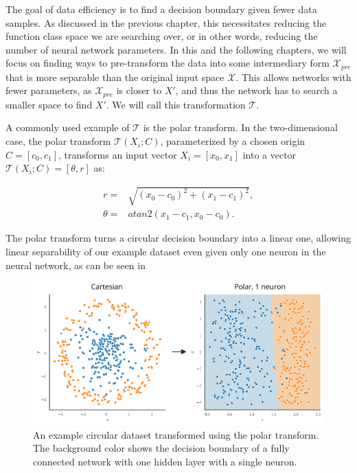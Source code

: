 The goal of data efficiency is to find a decision boundary given fewer data samples. As discussed in the previous chapter, this necessitates reducing the function class space we are searching over, or in other words, reducing the number of neural network parameters. In this and the following chapters, we will focus on finding ways to pre-transform the data into some intermediary form $\mathcal{X}_{pre}$ that is more separable than the original input space $\mathcal{X}$. This allows networks with fewer parameters, as $\mathcal{X}_{pre}$ is closer to $X'$, and thus the network has to search a smaller space to find $X'$. We will call this transformation $\mathcal{T}$.

A commonly used example of $\mathcal{T}$ is the polar transform. In the two-dimensional case, the polar transform $\mathcal{T}(X_i; C)$, parameterized by a chosen origin $C = [c_0, c_1]$, transforms an input vector $X_i = [x_0, x_1]$ into a vector $\mathcal{T}(X_i; C) = [\theta, r]$ as:

\begin{equation}
    \begin{aligned}
	r =& \sqrt{(x_0 - c_0)^2 + (x_1 - c_1)^2},\\
	\theta =& atan2(x_1 - c_1, x_0 - c_0).
    \end{aligned}
\end{equation}

The polar transform turns a circular decision boundary into a linear one, allowing linear separability of our example dataset even given only one neuron in the neural network, as can be seen in 

	\begin{figure}[h]
		\centering
		\includegraphics[width=0.65\linewidth]{images/4/polar_dataset_neurons}
		\caption{An example circular dataset transformed using the polar transform. The background color shows the decision boundary of a fully connected network with one hidden layer with a single neuron.}
		\label{fig:polar_dataset_neurons}
	\end{figure}

